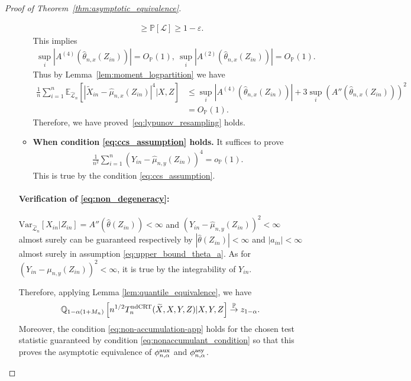 \documentclass[12pt]{article}
\theoremstyle{definition}
\def\P{\mathbb{P}}
\def\P{\mathbb{P}}
\newcommand{\E}{\mathbb E}								%
\newcommand{\V}{\mathrm{Var}}							%
\renewcommand{\P}{\mathbb{P}}							%
\newcommand{\Q}{\mathbb{Q}}								%
\newcommand{\convp}{\overset{\mathbb{P}}{\rightarrow}}             %
\newcommand{\srx}{X}									%
\newcommand{\srz}{Z}									%
\newcommand{\srxk}{\widetilde X}						%
\newcommand{\sry}{Y}									%
\newcommand{\lawhat}{\widehat{\mathcal L}}				%
\newcommand{\ndCRThat}{\textnormal{ndCRT}}	%
\newcommand{\aux}{\textnormal{aux}}               %
\newcommand{\asy}{\textnormal{asy}}              %
\begin{document}
\begin{proof}[Proof of Theorem~\ref{thm:asymptotic_equivalence}]
\begin{enumerate}
\begin{itemize}
\begin{align*}
		&
		\geq\P[\mathcal{L}]\geq 1-\varepsilon.
	  \end{align*}
	  This implies
	  \begin{align*}
		\sup_i|A^{(4)}(\widehat{\theta}_{n,x}(\srz_{in}))|=O_{\P}(1),\ \sup_i |A^{(2)}(\widehat{\theta}_{n,x}(\srz_{in}))|=O_{\P}(1).
	  \end{align*}
	  Thus by Lemma~\ref{lem:moment_logpartition} we have 
	  \small
	  \begin{align*}
		\frac{1}{n}\sum_{i=1}^n \E_{\lawhat_n}[|\srxk_{in}-\widehat\mu_{n,x}(\srz_{in})|^4|\srx,\srz]
		&
		\leq \sup_i|A^{(4)}(\widehat{\theta}_{n,x}(\srz_{in}))|+3\sup_i(A''(\widehat{\theta}_{n,x}(\srz_{in})))^2\\
		&
		=O_{\P}(1).
	  \end{align*}
	  Therefore, we have proved~\eqref{eq:lypunov_resampling} holds. 
	  \item\textbf{When condition \eqref{eq:ccs_assumption} holds.} It suffices to prove 
	  \begin{align*}
		\frac{1}{n^2}\sum_{i=1}^n (\sry_{in}-\widehat{\mu}_{n,y}(\srz_{in}))^4=o_{\P}(1).
	  \end{align*}
	  This is true by the condition \eqref{eq:ccs_assumption}.
	\end{itemize}
	
	\paragraph{Verification of \eqref{eq:non_degeneracy}:}
	  
	$\V_{\lawhat_n}[\srx_{in}|\srz_{in}]=A''(\widehat{\theta}(\srz_{in}))<\infty$ and $(\sry_{in}-\widehat{\mu}_{n,y}(\srz_{in}))^2<\infty$ almost surely can be guaranteed respectively by $|\widehat{\theta}(\srz_{in})|<\infty$ and $|a_{in}|<\infty$ almost surely in assumption \eqref{eq:upper_bound_theta_a}. As for $(\sry_{in}-\mu_{n,y}(\srz_{in}))^2<\infty$, it is true by the integrability of $\sry_{in}$.
	  
	Therefore, applying Lemma \ref{lem:quantile_equivalence}, we have
		\begin{align*}
		  \Q_{1-\alpha(1+M_n)}\left[n^{1/2}T_n^{\ndCRThat}(\srxk, \srx, \sry,\srz)|\srx,\sry,\srz\right]\convp z_{1-\alpha}.
	  \end{align*}
	  Moreover, the condition \eqref{eq:non-accumulation-app} holds for the chosen test statistic guaranteed by condition \eqref{eq:nonaccumulant_condition} so that this proves the asymptotic equivalence of $\phi_{n,\alpha}^{\aux}$ and $\phi_{n,\alpha}^{\asy}$.


\end{enumerate}
\end{proof}
\end{document}
